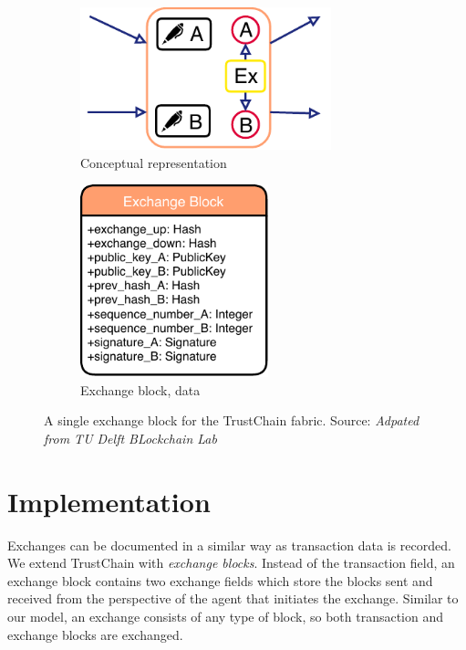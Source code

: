 \begin{figure}[h!]
    \centering
    \begin{subfigure}{0.49\textwidth}
        \centering
        \includegraphics[width=0.8\textwidth]{images/exchange_block.pdf}
        \caption{Conceptual representation}
        \label{fig:exchange_block_conceptual}
    \end{subfigure}
    \begin{subfigure}{0.49\textwidth}
        \centering
        \includegraphics[width=0.6\textwidth]{images/exchange_block_data.pdf}
        \caption{Exchange block, data}
        \label{fig:exchange_block_data}
    \end{subfigure}
    \caption{A single exchange block for the TrustChain fabric. Source: \textit{Adpated from TU Delft BLockchain Lab}}
    \label{fig:exchange_block}
\end{figure}


\section{Implementation}
Exchanges can be documented in a similar way as transaction data is recorded. We extend TrustChain with \textit{exchange blocks}. Instead of the transaction
field, an exchange block contains two exchange fields which store the blocks sent and received from the perspective of
the agent that initiates the exchange. Similar to our model, an exchange consists of any type of block, so both transaction and exchange 
blocks are exchanged. 

